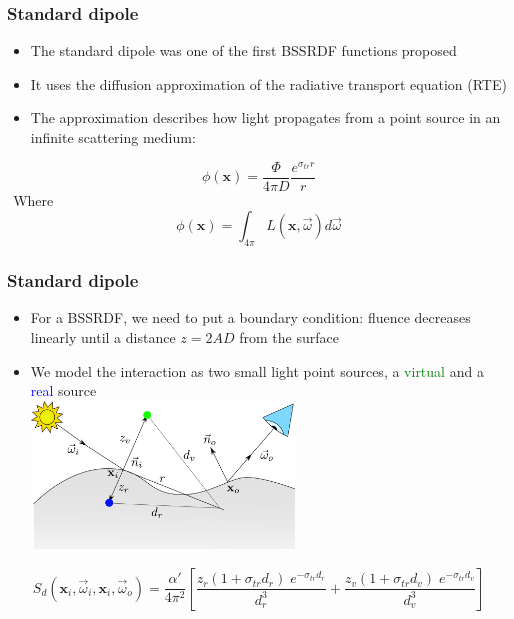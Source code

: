 \documentclass{beamer}
\newcommand{\vomega}{\vec{\omega}}
\newcommand{\x}{\mathbf{x}}
\begin{document}
\begin{frame}
    \frametitle{Standard dipole}
			\begin{itemize}
				\item The standard dipole \citep{Jensen:2001:PMS:383259.383319} was one of the first BSSRDF functions proposed
				\item It uses the diffusion approximation \citep{books/daglib/0093591} of the radiative transport equation (RTE)
				\item The approximation describes how light propagates from a point source in an infinite scattering medium:
			\end{itemize}
\begin{equation*}
\phi(\x) = \frac{\Phi}{4\pi D} \frac{e^{\sigma_{tr} r}}{r}
\label{eq:dasimple}
\end{equation*}
$\ \ $Where
$$\phi(\x) = \int_{4\pi}L(\x,\vomega) d\vomega$$
\end{frame}
\begin{frame}
    \frametitle{Standard dipole}
			\begin{itemize}
			\vspace{0.5cm}
				\item For a BSSRDF, we need to put a boundary condition: fluence decreases linearly until a distance $z = 2AD$ from the surface
				\item We model the interaction as two small light point sources, a \textcolor{green}{virtual} and a \textcolor{blue}{real} source \\
				\centering
				\vspace{0.2cm}
				\includegraphics[width=0.55\textwidth]{jensen}
			\end{itemize}
	$$
S_d(\x_i,\vomega_i,\x_i,\vomega_o) = \frac{\alpha'}{4 \pi^2} \left[\frac{z_r (1 + \sigma_{tr} d_r) \; e^{-\sigma_{tr} d_r}}{d_r^3} + \frac{z_v (1 + \sigma_{tr} d_v) \; e^{-\sigma_{tr} d_v}}{d_v^3} \right]
$$			

\end{frame}
\end{document}
